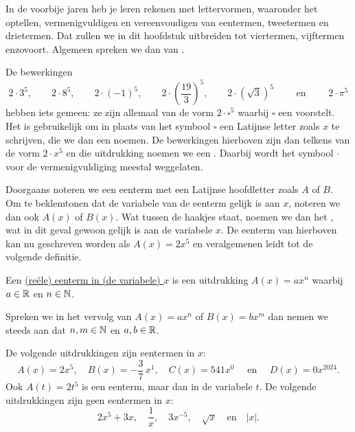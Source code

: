 \documentclass{ximera}
\begin{document}
	\author{Koen De Naeghel}
	\label{xim:veeltermen_eentermen}



In de voorbije jaren heb je leren rekenen met lettervormen, waaronder het optellen, ver\-menigvuldigen en vereenvoudigen van eentermen, tweetermen en drietermen. Dat zullen we in dit hoofdstuk uitbreiden tot viertermen, vijftermen enzovoort. Algemeen spreken we dan van .


De bewerkingen
\[
2\cdot 3^5, \qquad 2\cdot 8^5, \qquad 2\cdot (-1)^5, \qquad 2\cdot\left(\frac{19}{3}\right)^5, \qquad 2\cdot\left(\sqrt{3}\right)^5 \qquad \text{ en } \qquad 2 \cdot \pi^5
\]
hebben iets gemeen: ze zijn allemaal van de vorm \( 2\cdot \square^5 \) waarbij \( \square \) een  voorstelt. Het is gebruikelijk om in plaats van het symbool \( \square \) een Latijnse letter zoals \( x \) te schrijven, die we dan een  noemen. De bewerkingen hierboven zijn dan telkens van de vorm \( 2 \cdot x^5 \) en die uitdrukking noemen we een . Daarbij wordt het symbool \( \cdot \) voor de vermenigvuldiging meestal weggelaten. 

Doorgaans noteren we een eenterm met een Latijnse hoofdletter zoals \( A \) of \( B \). Om te beklemtonen dat de variabele van de eenterm gelijk is aan \( x \), noteren we dan ook \( A(x) \) of \( B(x) \). Wat tussen de haakjes staat, noemen we dan het , wat in dit geval gewoon gelijk is aan de variabele \( x \). De eenterm van hierboven kan nu geschreven worden als \( A(x) = 2x^5 \) en veralgemenen leidt tot de volgende definitie.

\begin{definition}
Een \underline{(re\"ele) eenterm in (de variabele) \( x \)} is een uitdrukking \( A(x) = ax^n \) waarbij \( a \in \mathbb{R} \) en \( n \in \mathbb{N} \). 
\end{definition}

Spreken we in het vervolg van  \( A(x) = ax^n \) of \( B(x) = bx^m \) dan nemen we steeds aan dat \( n,m\in \mathbb{N} \) en \( a,b\in \mathbb{R} \).

\begin{example}
De volgende uitdrukkingen zijn eentermen in \( x \):
\[
A(x) = 2x^5, \quad B(x) = -\frac{3}{7}\,x^1, \quad C(x) = 541x^0 \quad \text{ en } \quad D(x) = 0x^{2024}.
\]
Ook \( A(t) = 2t^5 \) is een eenterm, maar dan in de variabele \( t \). De volgende uitdrukkingen zijn geen eentermen in \( x \):
\[
2x^5+3x, \quad \frac{1}{x}, \quad 3x^{-5}, \quad \sqrt{x} \quad \text{en} \quad \left|x\right|.
\] 
\end{example}
\end{document}
